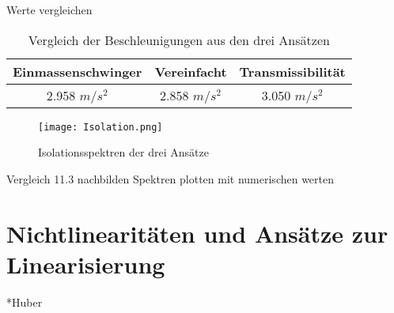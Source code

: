 Werte vergleichen


\begin{table}[H]
\centering
\begin{tabular}{ |c|c|c| } 
 \hline
 Einmassenschwinger & Vereinfacht & Transmissibilität\\
 \hline\hline
 2.958 $m/s^2$ & 2.858 $m/s^2$ & 3.050 $m/s^2$\\
 \hline
\end{tabular}
\caption{Vergleich der Beschleunigungen aus den drei Ansätzen}
\end{table}


\begin{figure}[H]
    \centering
    \texttt{[image: Isolation.png]}
    \caption{Isolationsspektren der drei Ansätze}
    \label{fig:Isolation}
\end{figure}

Vergleich 11.3 nachbilden
Spektren plotten mit numerischen werten

\section{Nichtlinearitäten und Ansätze zur Linearisierung}
\label{sec:nichtlinearitaten}

*Huber

\pagebreak